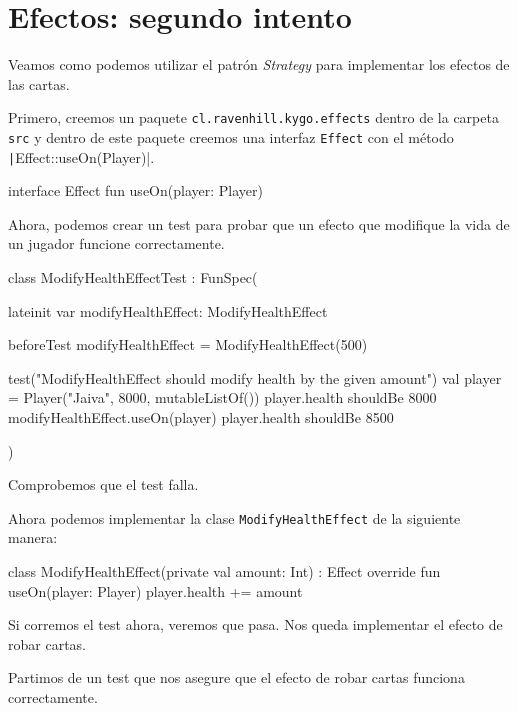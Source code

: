 \section{Efectos: segundo intento}
  Veamos como podemos utilizar el patrón \textit{Strategy} para implementar los efectos de las 
  cartas.

  Primero, creemos un paquete \texttt{cl.ravenhill.kygo.effects} dentro de la carpeta \texttt{src}
  y dentro de este paquete creemos una interfaz \texttt{Effect} con el método 
  \texttt|Effect::useOn(Player)|.

  \begin{kotlin}
    interface Effect {
      fun useOn(player: Player)
    }
  \end{kotlin}

  Ahora, podemos crear un test para probar que un efecto que modifique la vida de un jugador
  funcione correctamente.

  \begin{kotlin}
    class ModifyHealthEffectTest : FunSpec({
      lateinit var modifyHealthEffect: ModifyHealthEffect
      
      beforeTest {
        modifyHealthEffect = ModifyHealthEffect(500)
      }
      
      test("ModifyHealthEffect should modify health by the given amount") {
        val player = Player("Jaiva", 8000, mutableListOf())
        player.health shouldBe 8000
        modifyHealthEffect.useOn(player)
        player.health shouldBe 8500
      }
    })
  \end{kotlin}

  Comprobemos que el test falla.

  Ahora podemos implementar la clase \texttt{ModifyHealthEffect} de la siguiente manera:

  \begin{kotlin}
    class ModifyHealthEffect(private val amount: Int) : Effect {
      override fun useOn(player: Player) {
        player.health += amount
      }
    }
  \end{kotlin}

  Si corremos el test ahora, veremos que pasa.
  Nos queda implementar el efecto de robar cartas.

  Partimos de un test que nos asegure que el efecto de robar cartas funciona correctamente.

